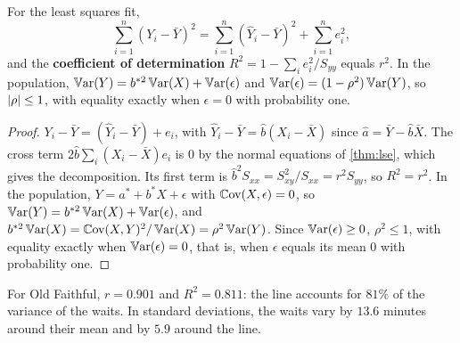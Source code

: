 \begin{proposition}
\label{prop:r2}
For the least squares fit,
\[
\sum_{i=1}^n (Y_i - \bar{Y})^2 = \sum_{i=1}^n (\hat{Y}_i - \bar{Y})^2 + \sum_{i=1}^n e_i^2,
\]
and the \textbf{coefficient of determination} $R^2 = 1 - \sum_i e_i^2/S_{yy}$ equals $r^2$.
In the population, $\operatorname*{\mathbb{V}\text{ar}}(Y) = b^{*2}\operatorname*{\mathbb{V}\text{ar}}(X) + \operatorname*{\mathbb{V}\text{ar}}(\epsilon)$ and $\operatorname*{\mathbb{V}\text{ar}}(\epsilon) = (1 - \rho^2)\operatorname*{\mathbb{V}\text{ar}}(Y)$, so $\lvert\rho\rvert \leq 1$, with equality exactly when $\epsilon = 0$ with probability one.
\end{proposition}
\begin{proof}
$Y_i - \bar{Y} = (\hat{Y}_i - \bar{Y}) + e_i$, with $\hat{Y}_i - \bar{Y} = \hat{b}(X_i - \bar{X})$ since $\hat{a} = \bar{Y} - \hat{b}\bar{X}$.
The cross term $2\hat{b}\sum_i (X_i - \bar{X})e_i$ is $0$ by the normal equations of \cref{thm:lse}, which gives the decomposition.
Its first term is $\hat{b}^2S_{xx} = S_{xy}^2/S_{xx} = r^2S_{yy}$, so $R^2 = r^2$.
In the population, $Y = a^* + b^*X + \epsilon$ with $\operatorname*{\mathbb{C}\text{ov}}(X, \epsilon) = 0$, so $\operatorname*{\mathbb{V}\text{ar}}(Y) = b^{*2}\operatorname*{\mathbb{V}\text{ar}}(X) + \operatorname*{\mathbb{V}\text{ar}}(\epsilon)$, and $b^{*2}\operatorname*{\mathbb{V}\text{ar}}(X) = \operatorname*{\mathbb{C}\text{ov}}(X, Y)^2/\operatorname*{\mathbb{V}\text{ar}}(X) = \rho^2\operatorname*{\mathbb{V}\text{ar}}(Y)$.
Since $\operatorname*{\mathbb{V}\text{ar}}(\epsilon) \geq 0$, $\rho^2 \leq 1$, with equality exactly when $\operatorname*{\mathbb{V}\text{ar}}(\epsilon) = 0$, that is, when $\epsilon$ equals its mean $0$ with probability one.
\end{proof}

For Old Faithful, $r = 0.901$ and $R^2 = 0.811$: the line accounts for $81\%$ of the variance of the waits.
In standard deviations, the waits vary by $13.6$ minutes around their mean and by $5.9$ around the line.

